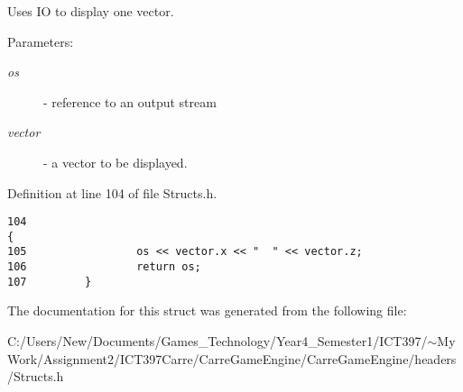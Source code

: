 Uses IO to display one vector. 

\begin{Desc}
\item[Parameters:]
\begin{description}
\item[{\em os}]- reference to an output stream \item[{\em vector}]- a vector to be displayed. \end{description}
\end{Desc}


Definition at line 104 of file Structs.h.

\begin{Code}\begin{verbatim}104                                                                                  {
105                 os << vector.x << "  " << vector.z;
106                 return os;
107         }
\end{verbatim}
\end{Code}




The documentation for this struct was generated from the following file:\begin{CompactItemize}
\item 
C:/Users/New/Documents/Games\_\-Technology/Year4\_\-Semester1/ICT397/$\sim$My Work/Assignment2/ICT397Carre/CarreGameEngine/CarreGameEngine/headers/Structs.h\end{CompactItemize}
